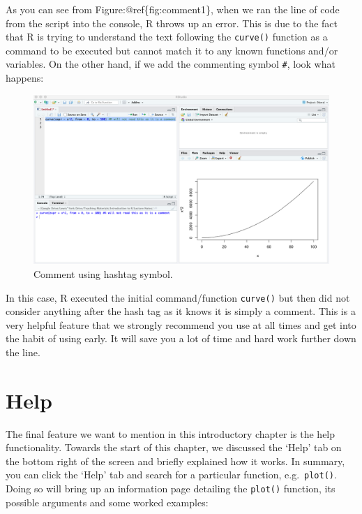 \documentclass[
]{book}
\theoremstyle{definition}
\theoremstyle{definition}
\theoremstyle{definition}
\theoremstyle{definition}
\theoremstyle{remark}
\begin{document}
As you can see from Figure:@ref\{fig:comment1\}, when we ran the line of code from the script into the console, R throws up an error. This is due to the fact that R is trying to understand the text following the \texttt{curve()} function as a command to be executed but cannot match it to any known functions and/or variables. On the other hand, if we add the commenting symbol \texttt{\#}, look what happens:

\begin{figure}

{\centering \includegraphics[width=0.7\linewidth]{Figures/comment} 

}

\caption{Comment using hashtag symbol.}\label{fig:comment2}
\end{figure}

In this case, R executed the initial command/function \texttt{curve()} but then did not consider anything after the hash tag as it knows it is simply a comment. This is a very helpful feature that we strongly recommend you use at all times and get into the habit of using early. It will save you a lot of time and hard work further down the line.

\hypertarget{help}{%
\section*{Help}\label{help}}

The final feature we want to mention in this introductory chapter is the help functionality. Towards the start of this chapter, we discussed the `Help' tab on the bottom right of the screen and briefly explained how it works. In summary, you can click the `Help' tab and search for a particular function, e.g.~\texttt{plot()}. Doing so will bring up an information page detailing the \texttt{plot()} function, its possible arguments and some worked examples:
\end{document}
